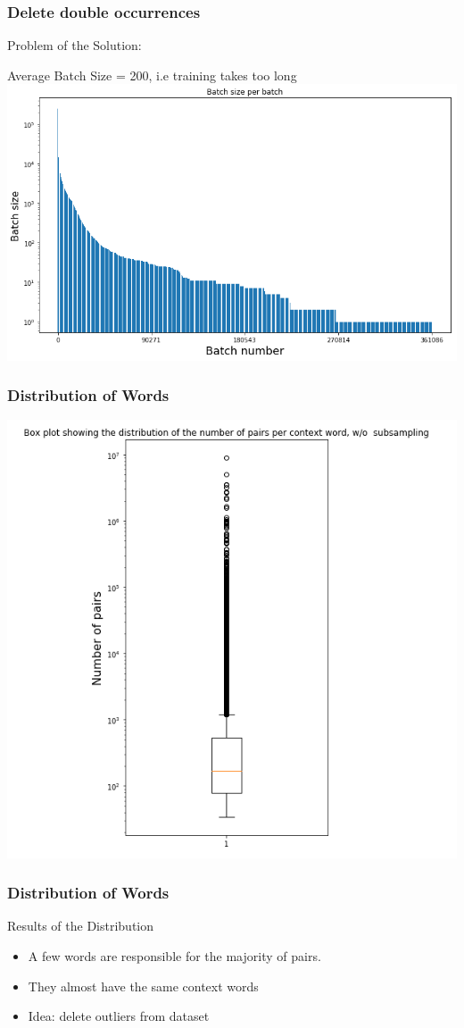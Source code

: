    \begin{frame}
\frametitle{Delete double occurrences}
\begin{large}
Problem of the Solution:\\
\end{large}
Average Batch Size = 200, i.e training takes too long
\includegraphics[scale=0.34]{images/batch_sizes}
  \end{frame}  
  
  
\begin{frame}
\frametitle{Distribution of Words}
\centering
\includegraphics[scale=0.4]{images/no_sampling_boxplot}
  \end{frame}
\begin{frame}
\frametitle{Distribution of Words}
\begin{Large}
Results of the Distribution
\end{Large}
\begin{itemize}
\item A few words are responsible for the majority of pairs. 
\item They almost have the same context words
\item Idea: delete outliers from dataset
\end{itemize}
  \end{frame}

